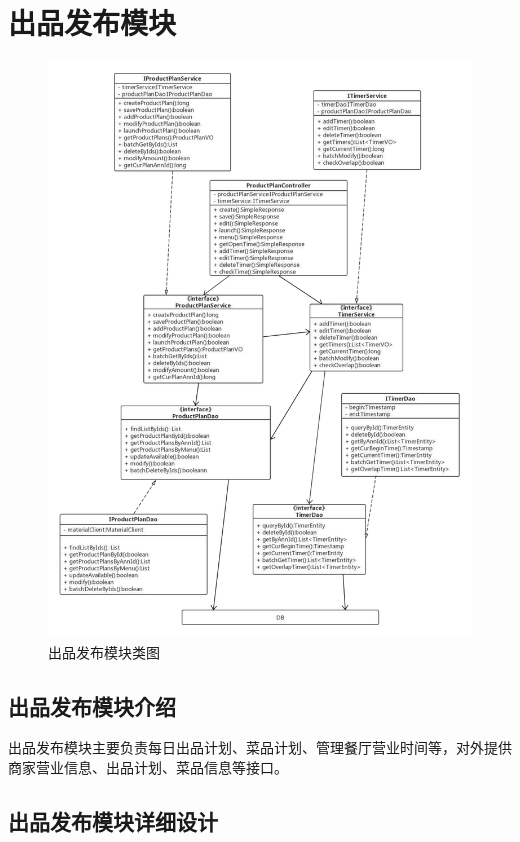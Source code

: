 \section{出品发布模块}
\begin{figure}[htbp!]
    \centering
    \includegraphics[width=\linewidth]{FIGs/chapter4/dish.pdf}
    \caption{出品发布模块类图}\label{fig_dish}
\end{figure}

\subsection{出品发布模块介绍}
出品发布模块主要负责每日出品计划、菜品计划、管理餐厅营业时间等，对外提供商家营业信息、出品计划、菜品信息等接口。\\

\subsection{出品发布模块详细设计}

